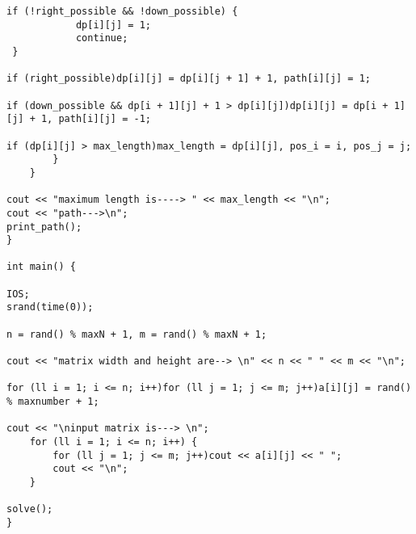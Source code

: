 \documentclass[10pt]{article}
\begin{document}
\begin{lstlisting}
if (!right_possible && !down_possible) {
			dp[i][j] = 1;
			continue;
 }

if (right_possible)dp[i][j] = dp[i][j + 1] + 1, path[i][j] = 1;

if (down_possible && dp[i + 1][j] + 1 > dp[i][j])dp[i][j] = dp[i + 1][j] + 1, path[i][j] = -1;

if (dp[i][j] > max_length)max_length = dp[i][j], pos_i = i, pos_j = j;
		}
	}

cout << "maximum length is----> " << max_length << "\n";
cout << "path--->\n";
print_path();
}

int main() {

IOS;
srand(time(0));

n = rand() % maxN + 1, m = rand() % maxN + 1;

cout << "matrix width and height are--> \n" << n << " " << m << "\n";

for (ll i = 1; i <= n; i++)for (ll j = 1; j <= m; j++)a[i][j] = rand() % maxnumber + 1;

cout << "\ninput matrix is---> \n";
	for (ll i = 1; i <= n; i++) {
		for (ll j = 1; j <= m; j++)cout << a[i][j] << " ";
		cout << "\n";
	}

solve();
}

\end{lstlisting}
\end{document}
